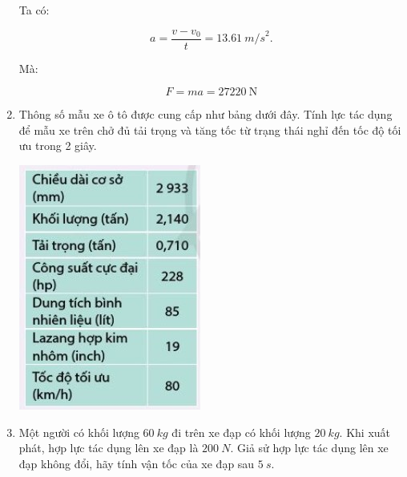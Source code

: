 \begin{enumerate}[label=\bfseries Bài \arabic*:]
{		Ta có:
		
		$$a = \dfrac{v - v_0}{t} = \SI{13,61}{m/s}^2.$$
		
		Mà: 
		
		$$F = ma = \SI{27220}{\newton}$$
		
	}
	\item {}
	
	{
		
		Thông số mẫu xe ô tô được cung cấp như bảng dưới đây. Tính lực tác dụng để mẫu xe trên chở đủ tải trọng và tăng tốc từ trạng thái nghỉ đến tốc độ tối ưu trong 2 giây.
		
		\begin{center}
			\includegraphics[scale=1]{../figs/VN10-2022-PH-TP016-1.jpg}
		\end{center}
		
	}
	
	\item {}
	
	{
		
		Một người có khối lượng $\SI{60}{kg}$ đi trên xe đạp có khối lượng $\SI{20}{kg}$. Khi xuất phát, hợp lực tác dụng lên xe đạp là $\SI{200}{N}$. Giả sử hợp lực tác dụng lên xe đạp không đổi, hãy tính vận tốc của xe đạp sau $\SI{5}{s}$.
	}
	
\end{enumerate}
